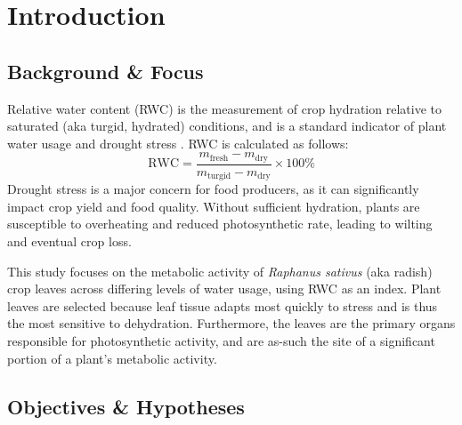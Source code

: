 \documentclass{report}
\begin{document}



\clearpage


\section{Introduction}


\subsection{Background \& Focus}


\hspace{24pt}Relative water content (RWC) is the measurement of crop hydration relative to saturated (aka turgid, hydrated) conditions, and is a standard indicator of plant water usage and drought stress \parencite{drought}. RWC is calculated as follows:
\[ \text{RWC} = \frac{m_\text{fresh} - m_\text{dry}}{m_\text{turgid} - m_\text{dry}} \times 100\% \]
Drought stress is a major concern for food producers, as it can significantly impact crop yield and food quality. Without sufficient hydration, plants are susceptible to overheating and reduced photosynthetic rate, leading to wilting and eventual crop loss.

\hspace{24pt}This study focuses on the metabolic activity of \textit{Raphanus sativus} (aka radish) crop leaves across differing levels of water usage, using RWC as an index. Plant leaves are selected because leaf tissue adapts most quickly to stress and is thus the most sensitive to dehydration. Furthermore, the leaves are the primary organs responsible for photosynthetic activity, and are as-such the site of a significant portion of a plant's metabolic activity.

\subsection{Objectives \& Hypotheses}
\end{document}
